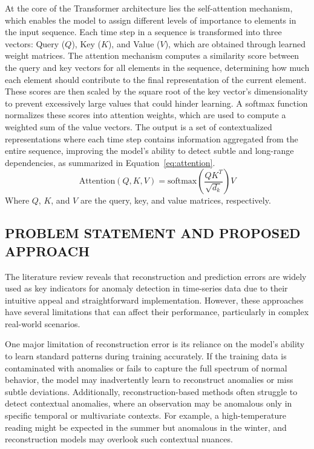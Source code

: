 \documentclass[conference]{IEEEtran}
\begin{document}
At the core of the Transformer architecture lies the self-attention mechanism, which enables the model to assign different levels of importance to elements in the input sequence. Each time step in a sequence is transformed into three vectors: Query (\(Q\)), Key (\(K\)), and Value (\(V\)), which are obtained through learned weight matrices. The attention mechanism computes a similarity score between the query and key vectors for all elements in the sequence, determining how much each element should contribute to the final representation of the current element. These scores are then scaled by the square root of the key vector's dimensionality to prevent excessively large values that could hinder learning. A softmax function normalizes these scores into attention weights, which are used to compute a weighted sum of the value vectors. The output is a set of contextualized representations where each time step contains information aggregated from the entire sequence, improving the model’s ability to detect subtle and long-range dependencies, as summarized in Equation~\ref{eq:attention}.
%
\begin{equation}
    \text{Attention}(Q, K, V) = \text{softmax}\left(\frac{QK^T}{\sqrt{d_k}}\right)V
    \label{eq:attention}
\end{equation}
%
Where \( Q \), \( K \), and \( V \) are the query, key, and value matrices, respectively.


\subsection{PROBLEM STATEMENT AND PROPOSED APPROACH}

The literature review reveals that reconstruction and prediction errors are widely used as key indicators for anomaly detection in time-series data due to their intuitive appeal and straightforward implementation. However, these approaches have several limitations that can affect their performance, particularly in complex real-world scenarios.

One major limitation of reconstruction error is its reliance on the
model's ability to learn standard patterns during training
accurately. If the training data is contaminated with anomalies or
fails to capture the full spectrum of normal behavior, the model may
inadvertently learn to reconstruct anomalies or miss subtle
deviations. Additionally, reconstruction-based methods often struggle
to detect contextual anomalies, where an observation may be anomalous
only in specific temporal or multivariate contexts. For example, a
high-temperature reading might be expected in the summer but anomalous
in the winter, and reconstruction models may overlook such contextual
nuances.
\end{document}
